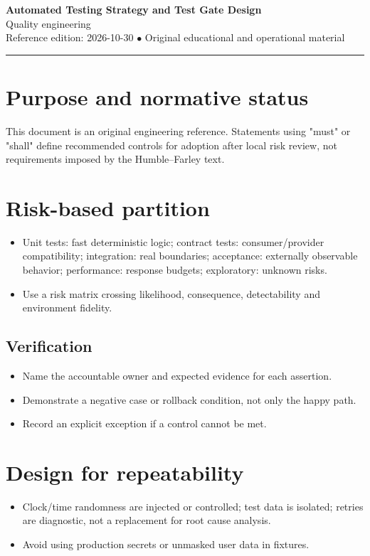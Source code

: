 \documentclass[10pt,letterpaper]{article}
\begin{document}
\begin{center}
{\LARGE\bfseries\color{cdblue}Automated Testing Strategy and Test Gate Design}\\[7pt]
{\large Quality engineering}\\[6pt]
{\small Reference edition: 2026-10-30 $\bullet$ Original educational and operational material}
\end{center}
\noindent\color{cdblue}\rule{\linewidth}{1.2pt}\color{black}
\vspace{0.4em}
\section{Purpose and normative status}
This document is an original engineering reference. Statements using "must" or "shall" define recommended controls for adoption after local risk review, not requirements imposed by the Humble--Farley text.


\section{Risk-based partition}
\begin{itemize}
\item Unit tests: fast deterministic logic; contract tests: consumer/provider compatibility; integration: real boundaries; acceptance: externally observable behavior; performance: response budgets; exploratory: unknown risks.
\item Use a risk matrix crossing likelihood, consequence, detectability and environment fidelity.
\end{itemize}
\subsection{Verification}
\begin{itemize}
\item Name the accountable owner and expected evidence for each assertion.
\item Demonstrate a negative case or rollback condition, not only the happy path.
\item Record an explicit exception if a control cannot be met.
\end{itemize}


\section{Design for repeatability}
\begin{itemize}
\item Clock/time randomness are injected or controlled; test data is isolated; retries are diagnostic, not a replacement for root cause analysis.
\item Avoid using production secrets or unmasked user data in fixtures.
\end{itemize}
\end{document}
